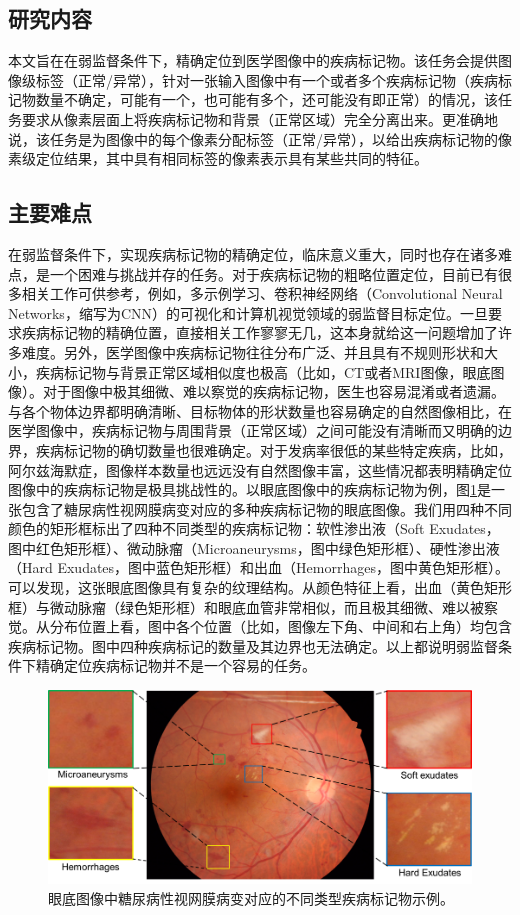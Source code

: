 \subsection{研究内容}
本文旨在在弱监督条件下，精确定位到医学图像中的疾病标记物。该任务会提供图像级标签（正常/异常），针对一张输入图像中有一个或者多个疾病标记物（疾病标记物数量不确定，可能有一个，也可能有多个，还可能没有即正常）的情况，该任务要求从像素层面上将疾病标记物和背景（正常区域）完全分离出来。更准确地说，该任务是为图像中的每个像素分配标签（正常/异常），以给出疾病标记物的像素级定位结果，其中具有相同标签的像素表示具有某些共同的特征。
\subsection{主要难点}
在弱监督条件下，实现疾病标记物的精确定位，临床意义重大，同时也存在诸多难点，是一个困难与挑战并存的任务。对于疾病标记物的粗略位置定位，目前已有很多相关工作可供参考，例如，多示例学习、卷积神经网络（Convolutional Neural Networks，缩写为CNN）的可视化和计算机视觉领域的弱监督目标定位。一旦要求疾病标记物的精确位置，直接相关工作寥寥无几，这本身就给这一问题增加了许多难度。另外，医学图像中疾病标记物往往分布广泛、并且具有不规则形状和大小，疾病标记物与背景正常区域相似度也极高（比如，CT或者MRI图像，眼底图像）。对于图像中极其细微、难以察觉的疾病标记物，医生也容易混淆或者遗漏。与各个物体边界都明确清晰、目标物体的形状数量也容易确定的自然图像相比，在医学图像中，疾病标记物与周围背景（正常区域）之间可能没有清晰而又明确的边界，疾病标记物的确切数量也很难确定。对于发病率很低的某些特定疾病，比如，阿尔兹海默症，图像样本数量也远远没有自然图像丰富，这些情况都表明精确定位图像中的疾病标记物是极具挑战性的。以眼底图像中的疾病标记物为例，图\ref{fig:biomarker_localization_example}是一张包含了糖尿病性视网膜病变对应的多种疾病标记物的眼底图像。我们用四种不同颜色的矩形框标出了四种不同类型的疾病标记物：软性渗出液（Soft Exudates，图中红色矩形框）、微动脉瘤（Microaneurysms，图中绿色矩形框）、硬性渗出液（Hard Exudates，图中蓝色矩形框）和出血（Hemorrhages，图中黄色矩形框）。可以发现，这张眼底图像具有复杂的纹理结构。从颜色特征上看，出血（黄色矩形框）与微动脉瘤（绿色矩形框）和眼底血管非常相似，而且极其细微、难以被察觉。从分布位置上看，图中各个位置（比如，图像左下角、中间和右上角）均包含疾病标记物。图中四种疾病标记的数量及其边界也无法确定。以上都说明弱监督条件下精确定位疾病标记物并不是一个容易的任务。
\begin{figure}[h!]
	\centering
	\includegraphics[width=1.0\textwidth]{figure/biomarker_localization_example}
	\caption[眼底图像中糖尿病性视网膜病变对应的不同类型疾病标记物示例]{眼底图像中糖尿病性视网膜病变对应的不同类型疾病标记物示例。} 
	\label{fig:biomarker_localization_example}
\end{figure}
